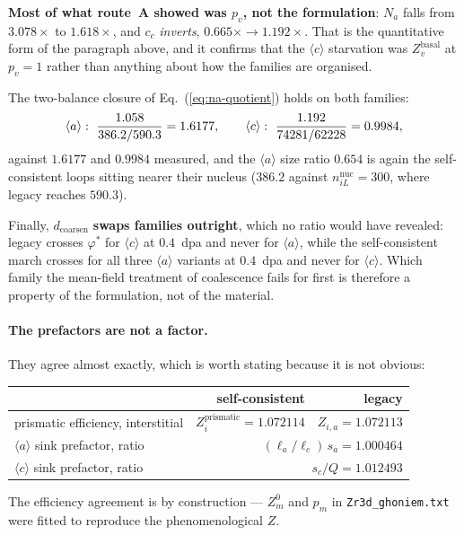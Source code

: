 \documentclass[11pt]{article}
\newcommand{\aloop}{\ensuremath{\langle a\rangle}}
\newcommand{\cloop}{\ensuremath{\langle c\rangle}}
\newcommand{\file}[1]{\texttt{\footnotesize #1}}
\begin{document}
\noindent
\textbf{Most of what route~A showed was $p_v$, not the formulation}: $N_a$ falls
from $3.078\times$ to $1.618\times$, and $c_c$ \emph{inverts}, $0.665\times \to
1.192\times$. That is the quantitative form of the paragraph above, and it
confirms that the \cloop{} starvation was $Z^{\text{basal}}_v$ at $p_v = 1$
rather than anything about how the families are organised.

The two-balance closure of Eq.~(\ref{eq:na-quotient}) holds on both families:
%
\[
\text{\aloop{}}:\ \frac{1.058}{386.2/590.3} = 1.6177,\qquad
\text{\cloop{}}:\ \frac{1.192}{74281/62228} = 0.9984,
\]
%
against $1.6177$ and $0.9984$ measured, and the \aloop{} size ratio $0.654$ is
again the self-consistent loops sitting nearer their nucleus ($386.2$ against
$n^{\mathrm{nuc}}_{iL} = 300$, where legacy reaches $590.3$).

Finally, $d_{\text{coarsen}}$ \textbf{swaps families outright}, which no ratio
would have revealed: legacy crosses $\varphi^\ast$ for \cloop{} at
$0.4$~\textrm{dpa} and never for \aloop{}, while the self-consistent march
crosses for all three \aloop{} variants at $0.4$~\textrm{dpa} and never for
\cloop{}. Which family the mean-field treatment of coalescence fails for first
is therefore a property of the formulation, not of the material.

\paragraph{The prefactors are not a factor.} They agree almost exactly, which is
worth stating because it is not obvious:
%
\begin{center}
\begin{tabular}{@{}lrr@{}}
\toprule
 & self-consistent & legacy \\
\midrule
prismatic efficiency, interstitial & $Z^{\text{prismatic}}_{i} = 1.072114$ & $Z_{i,a} = 1.072113$ \\
\aloop{} sink prefactor, ratio     & \multicolumn{2}{r}{$(\ell_a/\ell_c)\,s_a = 1.000464$} \\
\cloop{} sink prefactor, ratio     & \multicolumn{2}{r}{$s_c/Q = 1.012493$} \\
\bottomrule
\end{tabular}
\end{center}
%
The efficiency agreement is by construction --- $Z^{0}_m$ and $p_m$ in
\file{Zr3d\_ghoniem.txt} were fitted to reproduce the phenomenological $Z$.
\end{document}
